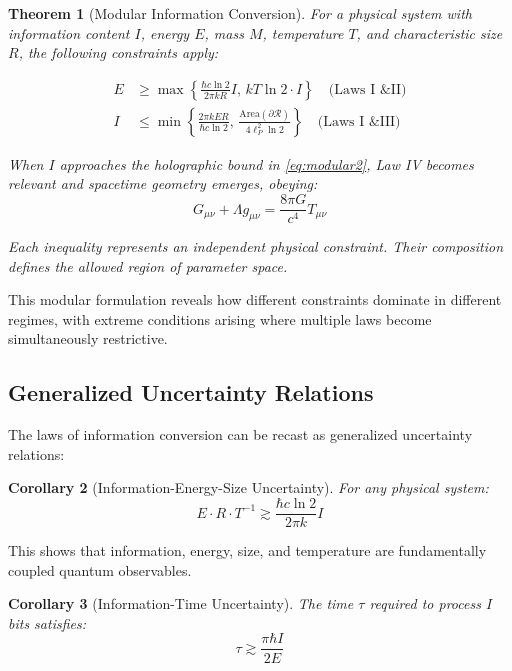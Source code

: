 \documentclass[11pt,a4paper]{article}
\theoremstyle{plain}
\newtheorem{theorem}{Theorem}[section]
\newtheorem{corollary}[theorem]{Corollary}
\theoremstyle{definition}
\theoremstyle{remark}
\begin{document}
\begin{theorem}[Modular Information Conversion]
For a physical system with information content $I$, energy $E$, mass $M$, temperature $T$, and characteristic size $R$, the following constraints apply:

\begin{align}
E &\geq \max\left\{\frac{\hbar c\ln 2}{2\pi kR}I,\, kT\ln 2\cdot I\right\} \quad \text{(Laws I \& II)} \label{eq:modular1}\\
I &\leq \min\left\{\frac{2\pi kER}{\hbar c\ln 2},\, \frac{\text{Area}(\partial\mathcal{R})}{4\ell_P^2\ln 2}\right\} \quad \text{(Laws I \& III)} \label{eq:modular2}
\end{align}

When $I$ approaches the holographic bound in \eqref{eq:modular2}, Law IV becomes relevant and spacetime geometry emerges, obeying:
\begin{equation}
G_{\mu\nu} + \Lambda g_{\mu\nu} = \frac{8\pi G}{c^4}T_{\mu\nu} \label{eq:modular3}
\end{equation}

Each inequality represents an independent physical constraint. Their composition defines the allowed region of parameter space.
\end{theorem}

This modular formulation reveals how different constraints dominate in different regimes, with extreme conditions arising where multiple laws become simultaneously restrictive.

\subsection{Generalized Uncertainty Relations}

The laws of information conversion can be recast as generalized uncertainty relations:

\begin{corollary}[Information-Energy-Size Uncertainty]
For any physical system:
\begin{equation}
E \cdot R \cdot T^{-1} \gtrsim \frac{\hbar c\ln 2}{2\pi k}I
\end{equation}
\end{corollary}

This shows that information, energy, size, and temperature are fundamentally coupled quantum observables.

\begin{corollary}[Information-Time Uncertainty]
The time $\tau$ required to process $I$ bits satisfies:
\begin{equation}
\tau \gtrsim \frac{\pi\hbar I}{2E}
\end{equation}
\end{corollary}
\end{document}
